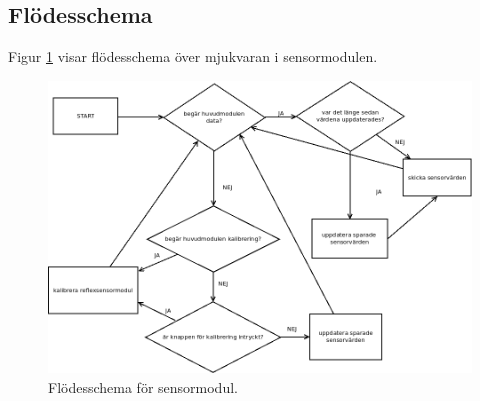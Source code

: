 \subsection{Flödesschema}
Figur \ref{systemskiss:sensorschema} visar flödesschema över mjukvaran i sensormodulen.

\begin{figure}[h]
\center
\includegraphics[scale=0.4]{sensorflow}
\caption{Flödesschema för sensormodul.} \label{systemskiss:sensorschema}
\end{figure}

%